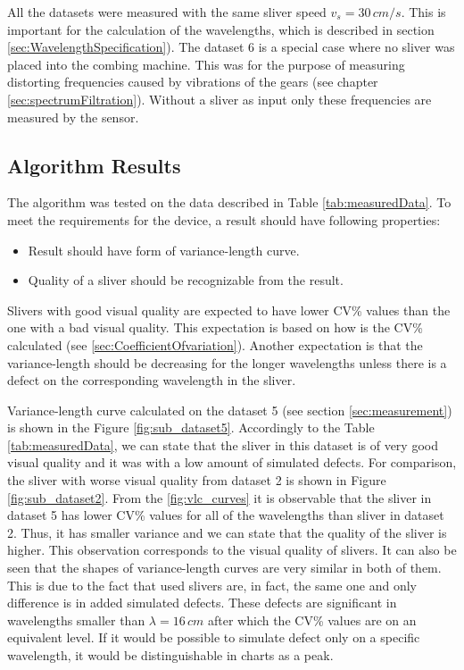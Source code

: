 \documentclass[twoside]{ctuthesis}
\theoremstyle{plain}
\theoremstyle{definition}
\theoremstyle{note}
\begin{document}
All the datasets were measured with the same sliver speed $v_s=30\,cm/s$. This is important for the calculation of the wavelengths, which is described in section \ref{sec:WavelengthSpecification}).
The dataset 6 is a special case where no sliver was placed into the combing machine. This was for the purpose of measuring distorting frequencies caused by vibrations of the gears (see chapter \ref{sec:spectrumFiltration}). Without a sliver as input only these frequencies are measured by the sensor.

\subsection{Algorithm Results}
The algorithm was tested on the data described in Table \ref{tab:measuredData}. To meet the requirements for the device, a result should have following properties:
\begin{itemize}
	\setlength{\itemsep}{5pt}
	\item Result should have form of variance-length curve.
	\item Quality of a sliver should be recognizable from the result.
\end{itemize}

Slivers with good visual quality are expected to have lower CV\% values than the one with a bad visual quality. This expectation is based on how is the CV\% calculated (see \ref{sec:CoefficientOfvariation}). Another expectation is that the variance-length should be decreasing for the longer wavelengths unless there is a defect on the corresponding wavelength in the sliver.

Variance-length curve calculated on the dataset 5 (see section \ref{sec:measurement}) is shown in the Figure \ref{fig:sub_dataset5}. Accordingly to the Table \ref{tab:measuredData}, we can state that the sliver in this dataset is of very good visual quality and it was with a low amount of simulated defects. For comparison, the sliver with worse visual quality from dataset 2 is shown in Figure \ref{fig:sub_dataset2}. From the \ref{fig:vlc_curves} it is observable that the sliver in dataset 5 has lower CV\% values for all of the wavelengths than sliver in dataset 2. Thus, it has smaller variance and we can state that the quality of the sliver is higher. This observation corresponds to the visual quality of slivers.
It can also be seen that the shapes of variance-length curves are very similar in both of them. This is due to the fact that used slivers are, in fact, the same one and only difference is in added simulated defects. These defects are significant in wavelengths smaller than $\lambda=16\,cm$ after which the CV\% values are on an equivalent level. If it would be possible to simulate defect only on a specific wavelength, it would be distinguishable in charts as a peak. 
\end{document}
